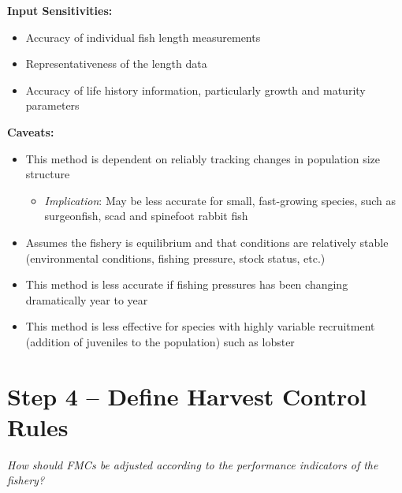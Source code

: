 \documentclass[]{book}
\providecommand{\tightlist}{%
  \setlength{\itemsep}{0pt}\setlength{\parskip}{0pt}}
\begin{document}
\textbf{Input Sensitivities: }

\begin{itemize}
\item
  Accuracy of individual fish length measurements
\item
  Representativeness of the length data
\item
  Accuracy of life history information, particularly growth and maturity
  parameters
\end{itemize}

\textbf{Caveats:}

\begin{itemize}
\item
  This method is dependent on reliably tracking changes in population
  size structure

  \begin{itemize}
  \tightlist
  \item
    \emph{Implication}: May be less accurate for small, fast-growing
    species, such as surgeonfish, scad and spinefoot rabbit fish
  \end{itemize}
\item
  Assumes the fishery is equilibrium and that conditions are relatively
  stable (environmental conditions, fishing pressure, stock status,
  etc.)
\item
  This method is less accurate if fishing pressures has been changing
  dramatically year to year
\item
  This method is less effective for species with highly variable
  recruitment (addition of juveniles to the population) such as lobster
\end{itemize}

\chapter{Step 4 -- Define Harvest Control Rules}\label{Step4}

\emph{How should FMCs be adjusted according to the performance
indicators of the fishery?}
\end{document}
